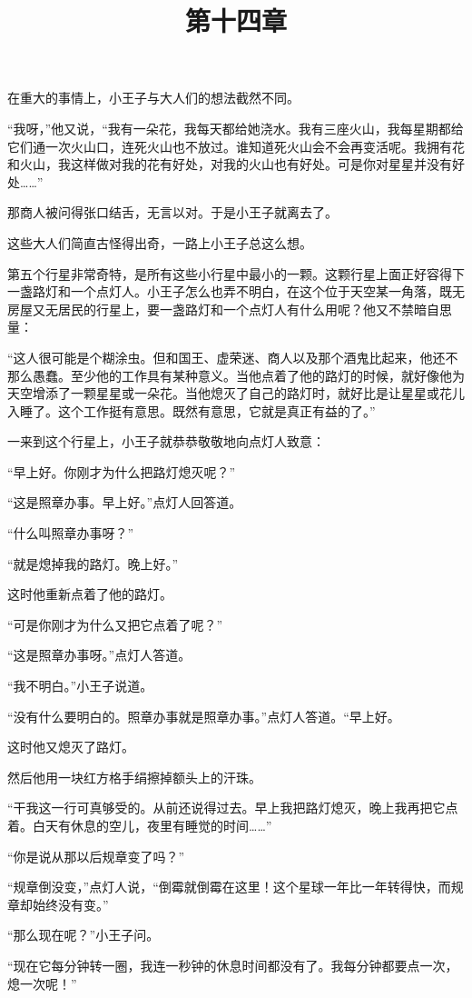 在重大的事情上，小王子与大人们的想法截然不同。

“我呀，”他又说，“我有一朵花，我每天都给她浇水。我有三座火山，我每星期都给它们通一次火山口，连死火山也不放过。谁知道死火山会不会再变活呢。我拥有花和火山，我这样做对我的花有好处，对我的火山也有好处。可是你对星星并没有好处\ldots{}\ldots{}”

那商人被问得张口结舌，无言以对。于是小王子就离去了。

这些大人们简直古怪得出奇，一路上小王子总这么想。

\title{第十四章}

第五个行星非常奇特，是所有这些小行星中最小的一颗。这颗行星上面正好容得下一盏路灯和一个点灯人。小王子怎么也弄不明白，在这个位于天空某一角落，既无房屋又无居民的行星上，要一盏路灯和一个点灯人有什么用呢？他又不禁暗自思量：

“这人很可能是个糊涂虫。但和国王、虚荣迷、商人以及那个酒鬼比起来，他还不那么愚蠢。至少他的工作具有某种意义。当他点着了他的路灯的时候，就好像他为天空增添了一颗星星或一朵花。当他熄灭了自己的路灯时，就好比是让星星或花儿入睡了。这个工作挺有意思。既然有意思，它就是真正有益的了。”

一来到这个行星上，小王子就恭恭敬敬地向点灯人致意：

“早上好。你刚才为什么把路灯熄灭呢？”

“这是照章办事。早上好。”点灯人回答道。

“什么叫照章办事呀？”

“就是熄掉我的路灯。晚上好。”

这时他重新点着了他的路灯。

“可是你刚才为什么又把它点着了呢？”

“这是照章办事呀。”点灯人答道。

“我不明白。”小王子说道。

“没有什么要明白的。照章办事就是照章办事。”点灯人答道。“早上好。

这时他又熄灭了路灯。

然后他用一块红方格手绢擦掉额头上的汗珠。

“干我这一行可真够受的。从前还说得过去。早上我把路灯熄灭，晚上我再把它点着。白天有休息的空儿，夜里有睡觉的时间\ldots{}\ldots{}”

“你是说从那以后规章变了吗？”

“规章倒没变，”点灯人说，“倒霉就倒霉在这里！这个星球一年比一年转得快，而规章却始终没有变。”

“那么现在呢？”小王子问。

“现在它每分钟转一圈，我连一秒钟的休息时间都没有了。我每分钟都要点一次，熄一次呢！”

